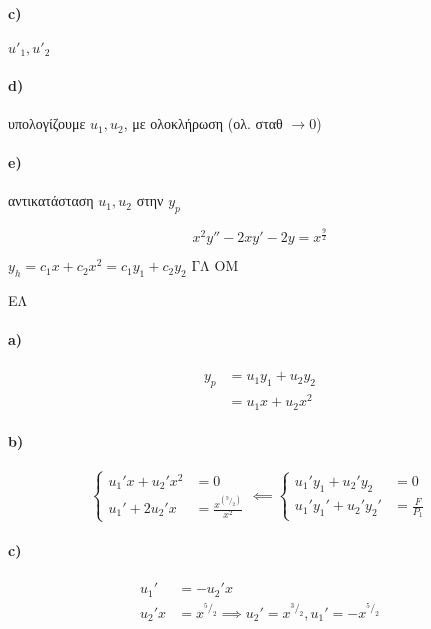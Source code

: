 \documentclass[11pt,a4paper,titlepage,draft]{article}
\begin{document}
\paragraph{\textlatin{c)}}
\(
u'_1,u'_2
\)

\paragraph{\textlatin{d)}}
υπολογίζουμε \(u_1,u_2\), με ολοκλήρωση (ολ. σταθ \(\rightarrow 0\))

\paragraph{\textlatin{e)}}
αντικατάσταση \(u_1,u_2\) στην \(y_p\)

\begin{exercise*}{6.1}
	\[
	x^2y'' -2xy' -2y = x^{\frac{9}{2}}
	\]

	\(
	y_h = c_1x+c_2x^2 = c_1y_1 + c_2y_2 \text{ ΓΛ ΟΜ}
	\)
	
		\tcblower
	ΕΛ
	\paragraph{\textlatin{a})}
	\begin{align*}
	y_p &= u_1y_1 + u_2y_2 \\
	    &= u_1x   + u_2x^2
	\end{align*}
	
	\paragraph{\textlatin{b})}\[
	\begin{cases}
	u_1'x+u_2'x^2 &=0 \\
	u_1' + 2u_2'x &= \frac{x^{\left( ^9/_2\right)}}{x^2}	
	\end{cases} \impliedby \begin{cases}
	u_1'y_1+u_2'y_2 &= 0\\
	u_1'y_1'+u_2'y_2' &= \frac{F}{P_1}
	\end{cases}
	\]
	
	\paragraph{\textlatin{c})}
	\begin{align*}
	u_1' &= -u_2' x\\
	u_2'x &= x ^ {^5/_2} \implies u_2' = x^{^3/_2}, u_1' = -x^{^5/_2}
	\end{align*}
	

\end{exercise*}
\end{document}
